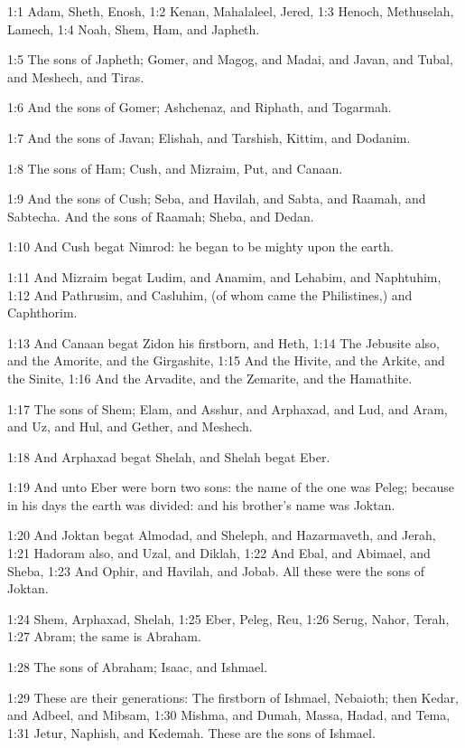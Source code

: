 

1:1 Adam, Sheth, Enosh, 1:2 Kenan, Mahalaleel, Jered, 1:3 Henoch,
Methuselah, Lamech, 1:4 Noah, Shem, Ham, and Japheth.

1:5 The sons of Japheth; Gomer, and Magog, and Madai, and Javan, and
Tubal, and Meshech, and Tiras.

1:6 And the sons of Gomer; Ashchenaz, and Riphath, and Togarmah.

1:7 And the sons of Javan; Elishah, and Tarshish, Kittim, and Dodanim.

1:8 The sons of Ham; Cush, and Mizraim, Put, and Canaan.

1:9 And the sons of Cush; Seba, and Havilah, and Sabta, and Raamah,
and Sabtecha. And the sons of Raamah; Sheba, and Dedan.

1:10 And Cush begat Nimrod: he began to be mighty upon the earth.

1:11 And Mizraim begat Ludim, and Anamim, and Lehabim, and Naphtuhim,
1:12 And Pathrusim, and Casluhim, (of whom came the Philistines,) and
Caphthorim.

1:13 And Canaan begat Zidon his firstborn, and Heth, 1:14 The Jebusite
also, and the Amorite, and the Girgashite, 1:15 And the Hivite, and
the Arkite, and the Sinite, 1:16 And the Arvadite, and the Zemarite,
and the Hamathite.

1:17 The sons of Shem; Elam, and Asshur, and Arphaxad, and Lud, and
Aram, and Uz, and Hul, and Gether, and Meshech.

1:18 And Arphaxad begat Shelah, and Shelah begat Eber.

1:19 And unto Eber were born two sons: the name of the one was Peleg;
because in his days the earth was divided: and his brother's name was
Joktan.

1:20 And Joktan begat Almodad, and Sheleph, and Hazarmaveth, and
Jerah, 1:21 Hadoram also, and Uzal, and Diklah, 1:22 And Ebal, and
Abimael, and Sheba, 1:23 And Ophir, and Havilah, and Jobab. All these
were the sons of Joktan.

1:24 Shem, Arphaxad, Shelah, 1:25 Eber, Peleg, Reu, 1:26 Serug, Nahor,
Terah, 1:27 Abram; the same is Abraham.

1:28 The sons of Abraham; Isaac, and Ishmael.

1:29 These are their generations: The firstborn of Ishmael, Nebaioth;
then Kedar, and Adbeel, and Mibsam, 1:30 Mishma, and Dumah, Massa,
Hadad, and Tema, 1:31 Jetur, Naphish, and Kedemah. These are the sons
of Ishmael.

